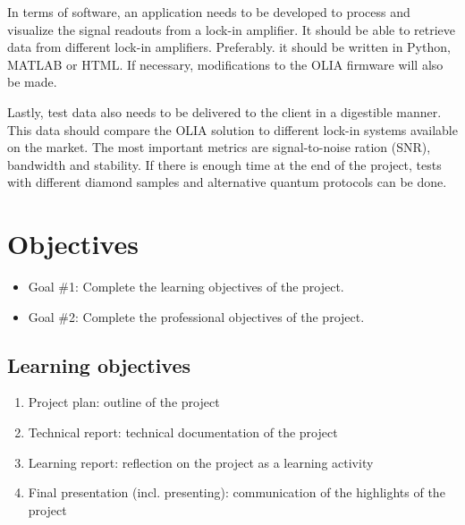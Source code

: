 \documentclass{report}
\begin{document}
	In terms of software, an application needs to be developed to process and visualize the signal readouts from a lock-in amplifier. It should be able to retrieve data from different lock-in amplifiers. Preferably. it should be written in Python, MATLAB or HTML. If necessary, modifications to the OLIA firmware will also be made. 
	
	Lastly, test data also needs to be delivered to the client in a digestible manner. This data should compare the OLIA solution to different lock-in systems available on the market. The most important metrics are signal-to-noise ration (SNR), bandwidth and stability. If there is enough time at the end of the project, tests with different diamond samples and alternative quantum protocols can be done.
	
	\section{Objectives}
	
	
	\begin{itemize}
		\item Goal \#1: Complete the learning objectives of the project.
		\item Goal \#2: Complete the professional objectives of the project.
	\end{itemize}
	
	\subsection{Learning objectives}
	\begin{enumerate}
		\item Project plan: outline of the project
		\item Technical report: technical documentation of the project
		\item Learning report: reflection on the project as a learning activity
		\item Final presentation (incl. presenting): communication of the highlights of the project 
	\end{enumerate}
	
\end{document}
